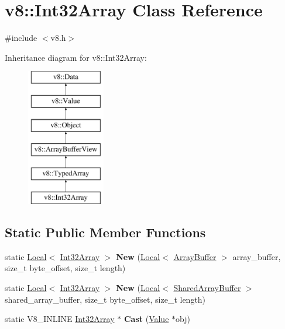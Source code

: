 \hypertarget{classv8_1_1Int32Array}{}\section{v8\+:\+:Int32\+Array Class Reference}
\label{classv8_1_1Int32Array}


{\ttfamily \#include $<$v8.\+h$>$}

Inheritance diagram for v8\+:\+:Int32\+Array\+:\begin{figure}[H]
\begin{center}
\leavevmode
\includegraphics[height=6.000000cm]{classv8_1_1Int32Array}
\end{center}
\end{figure}
\subsection*{Static Public Member Functions}
\begin{DoxyCompactItemize}
\item 
static \hyperlink{classv8_1_1Local}{Local}$<$ \hyperlink{classv8_1_1Int32Array}{Int32\+Array} $>$ {\bfseries New} (\hyperlink{classv8_1_1Local}{Local}$<$ \hyperlink{classv8_1_1ArrayBuffer}{Array\+Buffer} $>$ array\+\_\+buffer, size\+\_\+t byte\+\_\+offset, size\+\_\+t length)\hypertarget{classv8_1_1Int32Array_a03adbd44725e3325d10bcc448e8bfd75}{}\label{classv8_1_1Int32Array_a03adbd44725e3325d10bcc448e8bfd75}

\item 
static \hyperlink{classv8_1_1Local}{Local}$<$ \hyperlink{classv8_1_1Int32Array}{Int32\+Array} $>$ {\bfseries New} (\hyperlink{classv8_1_1Local}{Local}$<$ \hyperlink{classv8_1_1SharedArrayBuffer}{Shared\+Array\+Buffer} $>$ shared\+\_\+array\+\_\+buffer, size\+\_\+t byte\+\_\+offset, size\+\_\+t length)\hypertarget{classv8_1_1Int32Array_acf112fc9df4e0bf2791be73264779905}{}\label{classv8_1_1Int32Array_acf112fc9df4e0bf2791be73264779905}

\item 
static V8\+\_\+\+I\+N\+L\+I\+NE \hyperlink{classv8_1_1Int32Array}{Int32\+Array} $\ast$ {\bfseries Cast} (\hyperlink{classv8_1_1Value}{Value} $\ast$obj)\hypertarget{classv8_1_1Int32Array_afe7cdf534deadc3d872d8a43778809f1}{}\label{classv8_1_1Int32Array_afe7cdf534deadc3d872d8a43778809f1}

\end{DoxyCompactItemize}
